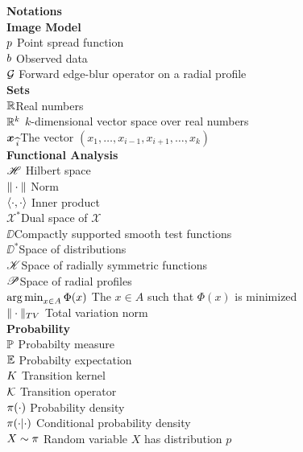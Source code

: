 {\bf {\Large Notations}} \\

{\bf {\large Image Model}}\\
$p \dotfill$ Point spread function\\
$b \dotfill$ Observed data\\
$\G \dotfill$ Forward edge-blur operator on a radial profile\\

{\bf {\large Sets}}\\
$\mathbb R$\dotfill Real numbers\\
$\mathbb R^k$  \dotfill $k$-dimensional vector space over real numbers\\
$\mbox{\boldmath$x$}_{\,\widehat{i}}$\dotfill The vector $(x_1,\dots,x_{i-1},x_{i+1},\dots,x_k)$\\

{\bf {\large Functional Analysis}}\\
$\HH \dotfill$ Hilbert space\\
$\|\cdot \| \dotfill$ Norm\\
$\langle \cdot,\cdot \rangle \dotfill$ Inner product\\
$\mathscr X^*$\dotfill Dual space of $\mathscr X$\\
$\DD$\dotfill Compactly supported smooth test functions\\
$\DD^*$\dotfill Space of distributions\\
$\mathscr K$\dotfill Space of radially symmetric functions\\
$\mathscr P$\dotfill Space of radial profiles\\
$\argmin_{x\in A} \Phi(x) \dotfill$ The $x\in A$ such that $\Phi(x)$ is minimized\\
$\|\cdot \|_{TV} \dotfill$ Total variation norm\\

{\bf {\large Probability}}\\
$\mathbb{P} \dotfill$ Probabilty measure\\
$\mathbb{E} \dotfill$ Probabilty expectation\\
$K \dotfill$ Transition kernel\\
$\K \dotfill$ Transition operator\\
$\pi(\cdot) \dotfill$ Probability density\\
$\pi(\cdot|\cdot) \dotfill$ Conditional probability density\\
$X\sim \pi \dotfill$ Random variable $X$ has distribution $p$ \\


\pagebreak
